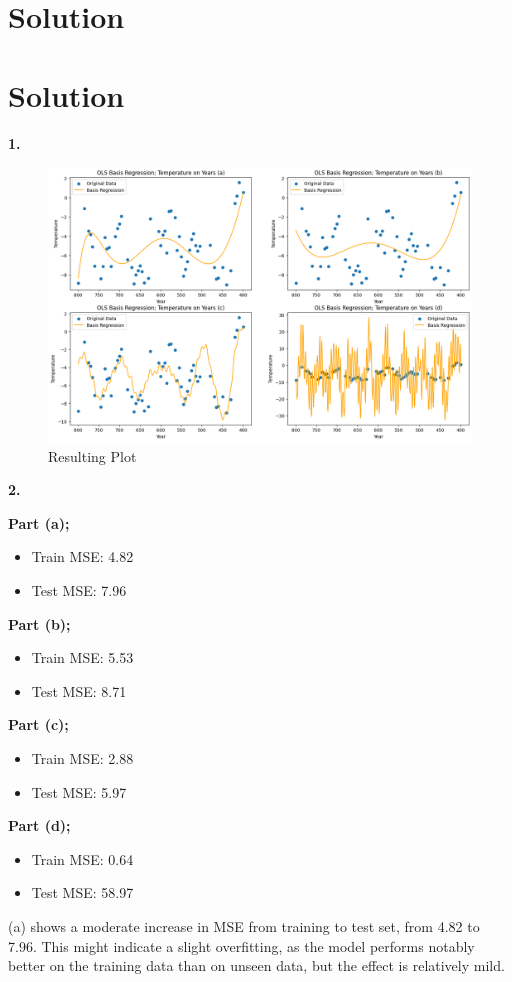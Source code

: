 \documentclass[submit]{harvardml}
\newenvironment{solution}
  {\color{blue}\section*{Solution}}
{}
\begin{document}
\begin{solution}
\begin{solution}
\bigskip
\textbf{1.}

\begin{figure}[h]
    \centering
    \includegraphics[width=0.80\linewidth]{output.png}
        \caption{Resulting Plot}
    \label{fig:enter-label}
\end{figure}

\bigskip
\textbf{2.}

\textbf{Part (a);}
 \begin{itemize}
     \item Train MSE: 4.82
     \item Test MSE: 7.96
 \end{itemize}


\textbf{Part (b);}
 \begin{itemize}
     \item Train MSE: 5.53
     \item Test MSE: 8.71
 \end{itemize}

\textbf{Part (c);}
 \begin{itemize}
     \item Train MSE: 2.88
     \item Test MSE: 5.97
 \end{itemize}


\textbf{Part (d);}

 \begin{itemize}
     \item Train MSE: 0.64
     \item Test MSE: 58.97
 \end{itemize}

(a) shows a moderate increase in MSE from training to test set, from 4.82 to 7.96. This might indicate a slight overfitting, as the model performs notably better on the training data than on unseen data, but the effect is relatively mild.


\end{solution}
\end{solution}
\end{document}

